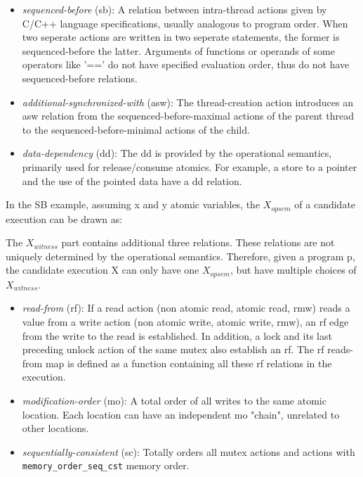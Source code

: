 \begin{itemize}
    \item \textit{sequenced-before} (sb): A relation between intra-thread actions given by C/C++ language specifications, usually analogous to program order. When two seperate actions are written in two seperate statements, the former is sequenced-before the latter. Arguments of functions or operands of some operators like '==' do not have specified evaluation order, thus do not have sequenced-before relations. 
    \item \textit{additional-synchronized-with} (asw): The thread-creation action introduces an asw relation from the sequenced-before-maximal actions of the parent thread to the sequenced-before-minimal actions of the child.
    \item \textit{data-dependency} (dd):  The dd is provided by the operational semantics, primarily used for release/consume atomics. For example, a store to a pointer and the use of the pointed data have a dd relation. 
\end{itemize}

In the SB example, assuming x and y atomic variables, the $X_{opsem}$ of a candidate execution can be drawn as: 

The $X_{witness}$ part contains additional three relations. These relations are not uniquely determined by the operational semantics. Therefore, given a program p, the candidate execution X can only have one $X_{opsem}$, but have multiple choices of $X_{witness}$. 

\begin{itemize}
    \item \textit{read-from} (rf): If a read action (non atomic read, atomic read, rmw) reads a value from a write action (non atomic write, atomic write, rmw), an rf edge from the write to the read is established. In addition, a lock and its last preceding unlock action of the same mutex also establish an rf. The rf reads-from map is defined as a function containing all these rf relations in the execution. 
    \item \textit{modification-order} (mo): A total order of all writes to the same atomic location. Each location can have an independent mo "chain", unrelated to other locations.
    \item \textit{sequentially-consistent} (sc): Totally orders all mutex actions and actions with \texttt{memory\_order\_seq\_cst} memory order.
\end{itemize}

